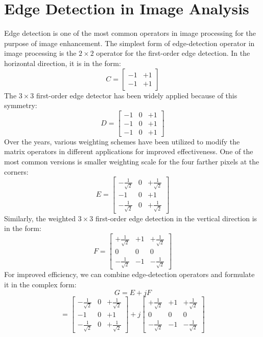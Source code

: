 \documentclass{article}
\begin{document}
\section{Edge Detection in Image Analysis}
Edge detection is one of the most common operators in image processing for the purpose of image enhancement. The simplest form of edge-detection operator in image processing is the \(2\times2\) operator for the first-order edge detection. In the horizontal direction, it is in the form:
\[
C=
\begin{bmatrix}
-1 & +1 \\
-1 & +1
\end{bmatrix}
\]
The \(3\times3\) first-order edge detector has been widely applied because of this symmetry:
\[
D=
\begin{bmatrix}
-1&0&+1\\
-1&0&+1\\
-1&0&+1
\end{bmatrix}
\]
Over the years, various weighting schemes have been utilized to modify the matrix operators in different applications for improved effectiveness. One of the most common versions is smaller weighting scale for the four farther pixels at the corners:
\[
E=
\begin{bmatrix}
-\frac{1}{\sqrt2}&0&+\frac{1}{\sqrt2}\\
-1&0&+1\\
-\frac{1}{\sqrt2}&0&+\frac{1}{\sqrt2}
\end{bmatrix}
\]
Similarly, the weighted \(3\times3\) first-order edge detection in the vertical direction is in the form:
\[
F=
\begin{bmatrix}
+\frac{1}{\sqrt2}&+1&+\frac{1}{\sqrt2}\\
0&0&0\\
-\frac{1}{\sqrt2}&-1&-\frac{1}{\sqrt2}
\end{bmatrix}
\]
For improved efficiency, we can combine edge-detection operators and formulate it in the complex form:
\[
G = E+jF
\]
\[
=
\begin{bmatrix}
-\frac{1}{\sqrt2}&0&+\frac{1}{\sqrt2}\\
-1&0&+1\\
-\frac{1}{\sqrt2}&0&+\frac{1}{\sqrt2}
\end{bmatrix}
+j
\begin{bmatrix}
+\frac{1}{\sqrt2}&+1&+\frac{1}{\sqrt2}\\
0&0&0\\
-\frac{1}{\sqrt2}&-1&-\frac{1}{\sqrt2}
\end{bmatrix}
\]
\end{document}
